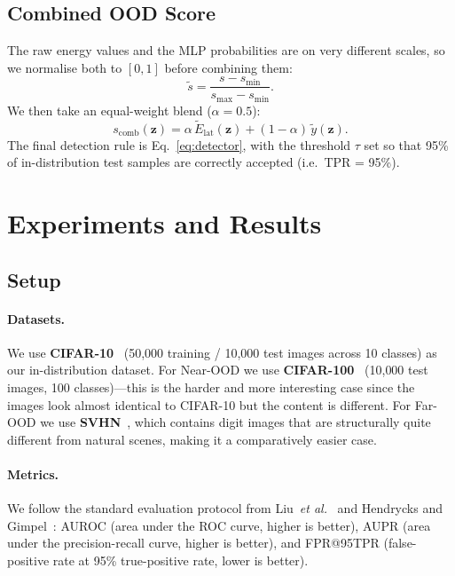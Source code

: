 \documentclass[10pt,twocolumn,letterpaper]{article}
\begin{document}
\subsection{Combined OOD Score}

The raw energy values and the MLP probabilities are on very different
scales, so we normalise both to $[0, 1]$ before combining them:
\begin{equation}
  \tilde{s} = \frac{s - s_{\min}}{s_{\max} - s_{\min}}.
  \label{eq:norm}
\end{equation}
We then take an equal-weight blend ($\alpha = 0.5$):
\begin{equation}
  s_{\mathrm{comb}}(\mathbf{z})
    = \alpha\,\tilde{E}_{\mathrm{lat}}(\mathbf{z})
    + (1-\alpha)\,\tilde{y}(\mathbf{z}).
  \label{eq:combined}
\end{equation}
The final detection rule is Eq.~\eqref{eq:detector}, with the threshold
$\tau$ set so that 95\% of in-distribution test samples are correctly
accepted (i.e.\ TPR = 95\%).

\section{Experiments and Results}

\subsection{Setup}

\paragraph{Datasets.}
We use \textbf{CIFAR-10}~\cite{krizhevsky2009cifar} (50{,}000 training /
10{,}000 test images across 10 classes) as our in-distribution dataset.
For Near-OOD we use \textbf{CIFAR-100}~\cite{krizhevsky2009cifar}
(10{,}000 test images, 100 classes)---this is the harder and more
interesting case since the images look almost identical to CIFAR-10 but
the content is different. For Far-OOD we use
\textbf{SVHN}~\cite{netzer2011svhn}, which contains digit images that
are structurally quite different from natural scenes, making it
a comparatively easier case.

\paragraph{Metrics.}
We follow the standard evaluation protocol from Liu~\emph{et
al.}~\cite{liu2020energy} and Hendrycks and Gimpel~\cite{hendrycks2017baseline}:
AUROC (area under the ROC curve, higher is better), AUPR (area under
the precision-recall curve, higher is better), and FPR@95TPR
(false-positive rate at 95\% true-positive rate, lower is better).
\end{document}
